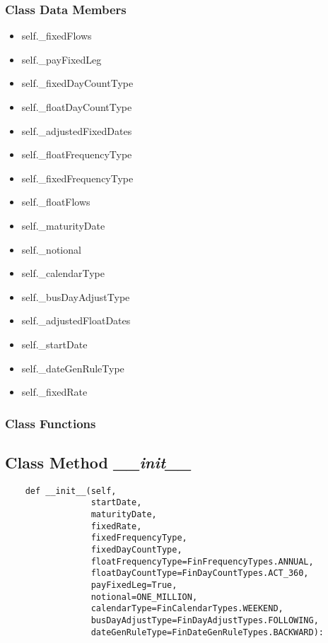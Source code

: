 \documentclass[twoside,11pt]{book}
\begin{document}
\subsubsection{Class Data Members}
\begin{itemize}
\item{self.\_fixedFlows}
\item{self.\_payFixedLeg}
\item{self.\_fixedDayCountType}
\item{self.\_floatDayCountType}
\item{self.\_adjustedFixedDates}
\item{self.\_floatFrequencyType}
\item{self.\_fixedFrequencyType}
\item{self.\_floatFlows}
\item{self.\_maturityDate}
\item{self.\_notional}
\item{self.\_calendarType}
\item{self.\_busDayAdjustType}
\item{self.\_adjustedFloatDates}
\item{self.\_startDate}
\item{self.\_dateGenRuleType}
\item{self.\_fixedRate}
\end{itemize}

\subsubsection{Class Functions}

\subsection{Class Method {\it \_\_init\_\_}}


\begin{lstlisting}
    def __init__(self,
                 startDate,
                 maturityDate,
                 fixedRate,
                 fixedFrequencyType,
                 fixedDayCountType,
                 floatFrequencyType=FinFrequencyTypes.ANNUAL,
                 floatDayCountType=FinDayCountTypes.ACT_360,
                 payFixedLeg=True,
                 notional=ONE_MILLION,
                 calendarType=FinCalendarTypes.WEEKEND,
                 busDayAdjustType=FinDayAdjustTypes.FOLLOWING,
                 dateGenRuleType=FinDateGenRuleTypes.BACKWARD):
\end{lstlisting}
\end{document}
